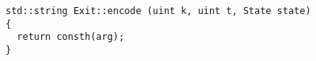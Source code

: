 


\begin{lstlisting}[style=c++, style=encode]
std::string Exit::encode (uint k, uint t, State state)
{
  return consth(arg);
}
\end{lstlisting}

